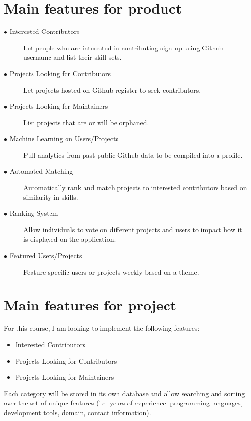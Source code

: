 \documentclass[11pt]{article}
\begin{document}
\section{Main features for product}
\begin{description}
\item [$\bullet$ Interested Contributors] Let people who are interested in contributing sign up using Github username and list their skill sets. 
\item [$\bullet$ Projects Looking for Contributors] Let projects hosted on Github register to seek contributors.
\item [$\bullet$ Projects Looking for Maintainers] List projects that are or will be orphaned.
\item [$\bullet$ Machine Learning on Users/Projects] Pull analytics from past public Github data to be compiled into a profile.
\item [$\bullet$ Automated Matching] Automatically rank and match projects to interested contributors based on similarity in skills.
\item [$\bullet$ Ranking System] Allow individuals to vote on different projects and users to impact how it is displayed on the application.
\item [$\bullet$ Featured Users/Projects] Feature specific users or projects weekly based on a theme.
\end{description}

\section{Main features for project}
For this course, I am looking to implement the following features:
\begin{itemize}
\item  Interested Contributors
\item Projects Looking for Contributors
\item Projects Looking for Maintainers
\end{itemize}
Each category will be stored in its own database and allow searching and sorting over the set of unique features (i.e. years of experience, programming languages, development tools, domain, contact information).
\end{document}
